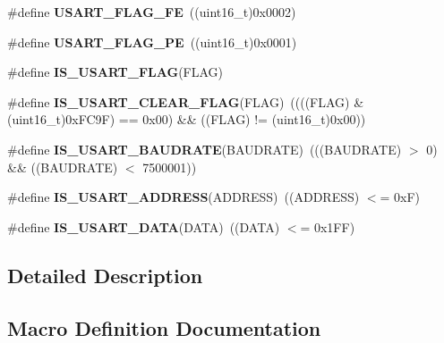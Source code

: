 \begin{DoxyCompactItemize}
\#define {\bfseries U\+S\+A\+R\+T\+\_\+\+F\+L\+A\+G\+\_\+\+FE}~((uint16\+\_\+t)0x0002)
\item 
\mbox{\label{group___u_s_a_r_t___flags_ga5e87fde5704f27c75df25395e23404ad}} 
\#define {\bfseries U\+S\+A\+R\+T\+\_\+\+F\+L\+A\+G\+\_\+\+PE}~((uint16\+\_\+t)0x0001)
\item 
\#define {\bfseries I\+S\+\_\+\+U\+S\+A\+R\+T\+\_\+\+F\+L\+AG}(F\+L\+AG)
\item 
\mbox{\label{group___u_s_a_r_t___flags_gadc905fdce8defba31c00c95554a26bc3}} 
\#define {\bfseries I\+S\+\_\+\+U\+S\+A\+R\+T\+\_\+\+C\+L\+E\+A\+R\+\_\+\+F\+L\+AG}(F\+L\+AG)~((((F\+L\+AG) \& (uint16\+\_\+t)0x\+F\+C9\+F) == 0x00) \&\& ((\+F\+L\+A\+G) != (uint16\+\_\+t)0x00))
\item 
\mbox{\label{group___u_s_a_r_t___flags_ga9dc365e0a1e01031a8e0757a34b9d420}} 
\#define {\bfseries I\+S\+\_\+\+U\+S\+A\+R\+T\+\_\+\+B\+A\+U\+D\+R\+A\+TE}(B\+A\+U\+D\+R\+A\+TE)~(((B\+A\+U\+D\+R\+A\+TE) $>$ 0) \&\& ((B\+A\+U\+D\+R\+A\+TE) $<$ 7500001))
\item 
\mbox{\label{group___u_s_a_r_t___flags_ga194e771c3324f9e130b2887c701460a7}} 
\#define {\bfseries I\+S\+\_\+\+U\+S\+A\+R\+T\+\_\+\+A\+D\+D\+R\+E\+SS}(A\+D\+D\+R\+E\+SS)~((A\+D\+D\+R\+E\+SS) $<$= 0x\+F)
\item 
\mbox{\label{group___u_s_a_r_t___flags_gafd6307e41818e076d31f3c24cb5ba135}} 
\#define {\bfseries I\+S\+\_\+\+U\+S\+A\+R\+T\+\_\+\+D\+A\+TA}(D\+A\+TA)~((D\+A\+TA) $<$= 0x1\+F\+F)
\end{DoxyCompactItemize}


\subsection{Detailed Description}


\subsection{Macro Definition Documentation}
\mbox{\label{group___u_s_a_r_t___flags_ga3e20747ce7c97a36718933c0cb3dac29}} 
